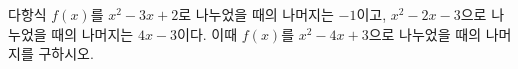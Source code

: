 다항식 $f(x)$를 $x^2-3x+2$로 나누었을 때의 나머지는 $-1$이고, $x^2-2x-3$으로 나누었을 때의 나머지는 $4x-3$이다. 이때 $f(x)$를 $x^2-4x+3$으로 나누었을 때의 나머지를 구하시오.
